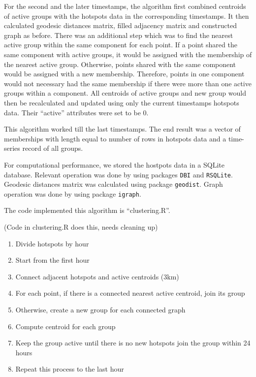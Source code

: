 For the second and the later timestamps, the algorithm first combined
centroids of active groups with the hotspots data in the corresponding
timestamps. It then calculated geodesic distances matrix, filled
adjacency matrix and constructed graph as before. There was an
additional step which was to find the nearest active group within the
same component for each point. If a point shared the same component with
active groups, it would be assigned with the membership of the nearest
active group. Otherwise, points shared with the same component would be
assigned with a new membership. Therefore, points in one component would
not necessary had the same membership if there were more than one active
groups within a component. All centroids of active groups and new group
would then be recalculated and updated using only the current timestamps
hotspots data. Their ``active'' attributes were set to be 0.

This algorithm worked till the last timestamps. The end result was a
vector of memberships with length equal to number of rows in hotspots
data and a time-series record of all groups.

For computational performance, we stored the hostpots data in a SQLite
database. Relevant operation was done by using packages \texttt{DBI} and
\texttt{RSQLite}. Geodesic distances matrix was calculated using package
\texttt{geodist}. Graph operation was done by using package
\texttt{igraph}.

The code implemented this algorithm is ``clustering.R''.

(Code in clustering.R does this, needs cleaning up)

\begin{enumerate}
\def\labelenumi{\arabic{enumi}.}
\tightlist
\item
  Divide hotspots by hour
\item
  Start from the first hour
\item
  Connect adjacent hotspots and active centroids (3km)
\item
  For each point, if there is a connected nearest active centroid, join
  its group
\item
  Otherwise, create a new group for each connected graph
\item
  Compute centroid for each group
\item
  Keep the group active until there is no new hotspots join the group
  within 24 hours
\item
  Repeat this process to the last hour
\end{enumerate}

